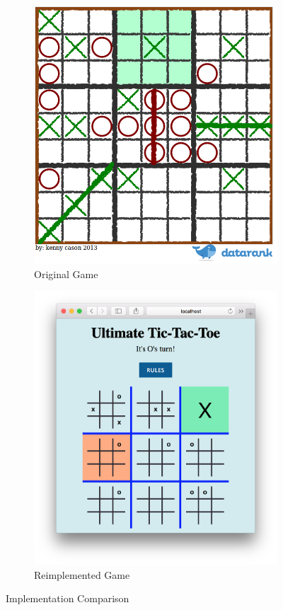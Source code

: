 \documentclass[12pt, titlepage]{article}
\begin{document}
\begin{figure}[H]
\begin{subfigure}{.5\textwidth}
  \centering
  \includegraphics[width=0.95\linewidth]{../../ReferenceMaterial/SourceGame_screenshot.png}
  \caption{Original Game}
  \label{fig:sub1}
\end{subfigure}
\begin{subfigure}{.5\textwidth}
  \centering
  \includegraphics[width=1\linewidth]{../../ReferenceMaterial/XwinInnerBoard_screenshot.png}
  \caption{Reimplemented Game}
  \label{fig:sub2}
\end{subfigure}
\caption{Implementation Comparison}
\label{fig:Comparison}
\end{figure}
\end{document}
